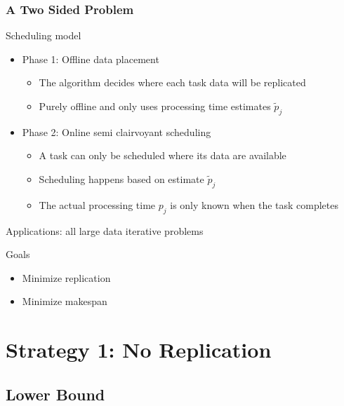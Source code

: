 \documentclass[usenames,dvipsnames]{beamer}
\begin{document}
\begin{frame}
  \frametitle{A Two Sided Problem}

  \begin{block}{Scheduling model}
    \begin{itemize}
    \item Phase 1: Offline data placement
      \begin{itemize}
      \item The algorithm decides where each task data will be
        replicated
      \item Purely offline and only uses processing time estimates $\tilde{p}_j$
      \end{itemize}
    \item Phase 2: Online semi clairvoyant scheduling
      \begin{itemize}
      \item A task can only be scheduled where its data are available
      \item Scheduling happens based on estimate $\tilde{p}_j$
      \item The actual processing time $p_j$ is only known when the task completes
      \end{itemize}
    \end{itemize}

    Applications: all large data iterative problems
  \end{block}
  
  \begin{block}{Goals}
    \begin{itemize}
    \item Minimize replication
    \item Minimize makespan
    \end{itemize}
  \end{block}
\end{frame}


\section{Strategy 1: No Replication}

\subsection{Lower Bound}
\end{document}
